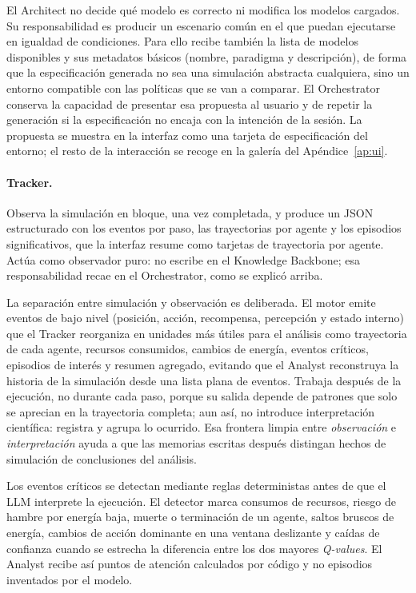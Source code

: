 El Architect no decide qué modelo es correcto ni modifica los modelos
cargados. Su responsabilidad es producir un escenario común en el que
puedan ejecutarse en igualdad de condiciones. Para ello recibe también la
lista de modelos disponibles y sus metadatos básicos (nombre, paradigma y
descripción), de forma que la especificación generada no sea una simulación
abstracta cualquiera, sino un entorno compatible con las políticas que se
van a comparar. El Orchestrator conserva la capacidad de presentar esa
propuesta al usuario y de repetir la generación si la especificación no
encaja con la intención de la sesión. La propuesta se muestra en la interfaz
como una tarjeta de especificación del entorno; el resto de la interacción se
recoge en la galería del Apéndice~\ref{ap:ui}.

\paragraph{Tracker.} Observa la simulación en bloque, una vez completada,
y produce un JSON estructurado con los eventos por paso, las trayectorias
por agente y los episodios significativos, que la interfaz resume como
tarjetas de trayectoria por agente. Actúa como observador puro:
no escribe en el Knowledge Backbone; esa
responsabilidad recae en el Orchestrator, como se explicó arriba.

La separación entre simulación y observación es deliberada. El motor emite
eventos de bajo nivel (posición, acción, recompensa, percepción y estado
interno) que el Tracker reorganiza en unidades más útiles para el análisis
como trayectoria de cada agente, recursos consumidos, cambios de energía,
eventos críticos, episodios de interés y resumen agregado, evitando que el
Analyst reconstruya la historia de la simulación desde una lista plana de
eventos. Trabaja después de la ejecución, no durante cada paso, porque su
salida depende de patrones que solo se aprecian en la trayectoria completa;
aun así, no introduce interpretación científica: registra y agrupa lo
ocurrido. Esa frontera limpia entre \emph{observación} e \emph{interpretación}
ayuda a que las memorias escritas después distingan hechos de simulación de
conclusiones del análisis.

Los eventos críticos se detectan mediante reglas deterministas antes de que el
LLM interprete la ejecución. El detector marca consumos de recursos, riesgo de
hambre por energía baja, muerte o terminación de un agente, saltos bruscos de
energía, cambios de acción dominante en una ventana deslizante y caídas de
confianza cuando se estrecha la diferencia entre los dos mayores
\textit{Q-values}. El Analyst recibe así puntos de atención calculados por
código y no episodios inventados por el modelo.

